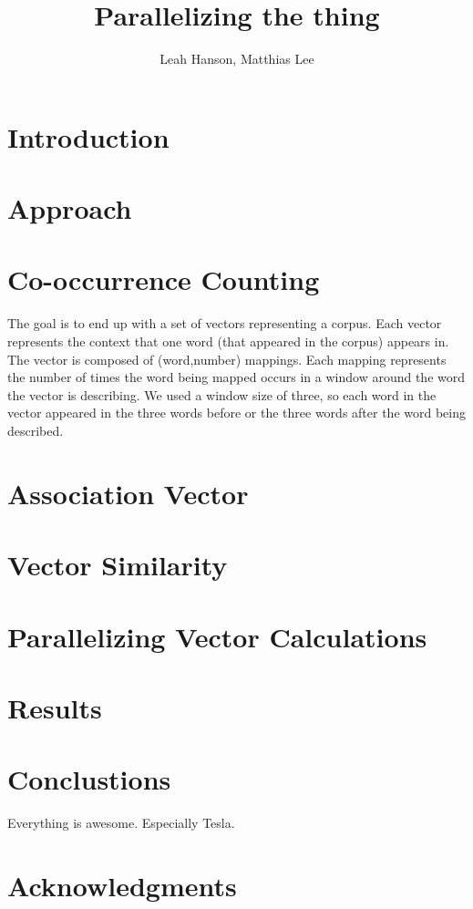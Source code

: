 \documentclass[12pt]{article}
\title{Parallelizing the thing}
\author{Leah Hanson, Matthias Lee }
\begin{document}
\maketitle

\section{Introduction}

\section{Approach}

\section{Co-occurrence Counting}

The goal is to end up with a set of vectors representing a
corpus. Each vector represents the context that one word (that appeared in the
corpus) appears in. The vector is composed of (word,number) mappings. Each
mapping represents the number of times the word being mapped occurs in a
window around the word the vector is describing. We used a window size of
three, so each word in the vector appeared in the three words before or the
three words after the word being described.

\section{Association Vector}

\section{Vector Similarity}

\section{Parallelizing Vector Calculations}

\section{Results}

\section{Conclustions}
Everything is awesome. Especially Tesla.

\section{Acknowledgments}

\end{document}
